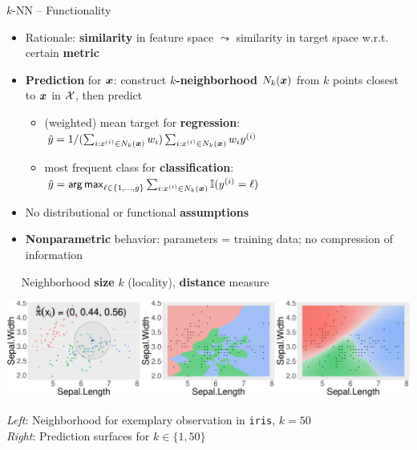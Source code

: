 \begin{frame}{$k$-NN -- Functionality}

 
 

\medskip

\begin{itemize}
  \item Rationale: \textbf{similarity} in feature space $\leadsto$ similarity 
  in target space w.r.t. certain \textbf{metric}
  \item \textbf{Prediction} for $\bm{x}$: construct \textbf{$k$-neighborhood} 
  $N_k(\bm{x})$ from $k$ points closest to $\bm{x}$ in $\mathcal{X}$, then 
  predict
  \begin{itemize}
    \footnotesize
    \item (weighted) mean target for \textbf{regression}: $\hat{y} = 1 / 
    (\sum_{i: x^{(i)} \in N_k(\bm{x})} w_i) \sum_{i: x^{(i)} \in N_k(\bm{x})} w_i y^{(i)}$
    \item most frequent class for \textbf{classification}: 
    $\hat{y} = \mathop{\sf arg\,max}_{\ell \in \{1, \ldots, g\}} \sum_{i: x^{(i)} \in N_k(\bm{x})} \mathbb{I}(y^{(i)} = \ell)$
  \end{itemize}
  \item No distributional or functional \textbf{assumptions}
  \item \textbf{Nonparametric} behavior: parameters = training data; no 
  compression of information
\end{itemize}

\medskip

 ~~ Neighborhood \textbf{size} $k$ (locality), 
\textbf{distance} measure

\vfill

\begin{minipage}{0.7\textwidth}
  \includegraphics[width=\textwidth]{figure/knn-neighborhood.pdf}
\end{minipage}%
\hfill
\begin{minipage}{0.25\textwidth}
  \tiny
  \raggedright
  \textit{Left}: Neighborhood for exemplary observation in \texttt{iris}, 
  $k = 50$ \\
  \textit{Right}: Prediction surfaces for $k \in \{1, 50\}$
\end{minipage}
\end{frame}

